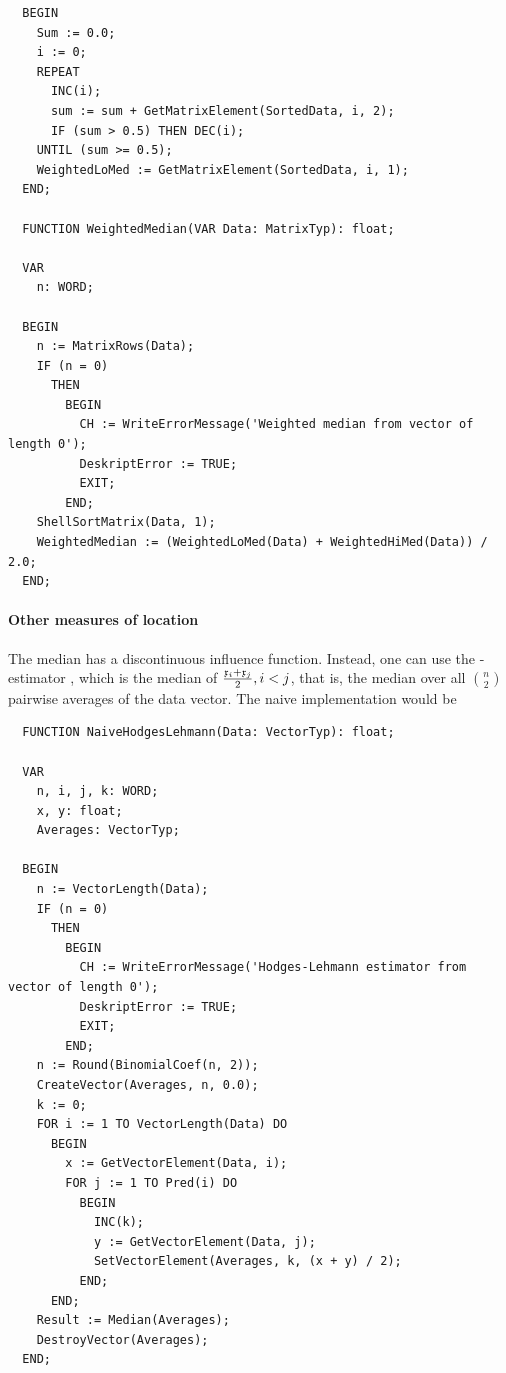 \begin{refsection}
\begin{lstlisting}
  BEGIN
    Sum := 0.0;
    i := 0;
    REPEAT
      INC(i);
      sum := sum + GetMatrixElement(SortedData, i, 2);
      IF (sum > 0.5) THEN DEC(i);
    UNTIL (sum >= 0.5);
    WeightedLoMed := GetMatrixElement(SortedData, i, 1);
  END;

  FUNCTION WeightedMedian(VAR Data: MatrixTyp): float;

  VAR
    n: WORD;

  BEGIN
    n := MatrixRows(Data);
    IF (n = 0)
      THEN
        BEGIN
          CH := WriteErrorMessage('Weighted median from vector of length 0');
          DeskriptError := TRUE;
          EXIT;
        END;
    ShellSortMatrix(Data, 1);
    WeightedMedian := (WeightedLoMed(Data) + WeightedHiMed(Data)) / 2.0;
  END;
\end{lstlisting}

\paragraph{Other measures of location}

The median has a discontinuous influence function. Instead, one can use the -estimator \parencite{Hod-63}, which is the median of \( \frac{\mathfrak{x}_i + \mathfrak{x}_j}{2}, i < j \), that is, the median over all \( \binom{n}{2} \) pairwise averages of the data vector. The naive implementation would be

\begin{lstlisting}
  FUNCTION NaiveHodgesLehmann(Data: VectorTyp): float;

  VAR
    n, i, j, k: WORD;
    x, y: float;
    Averages: VectorTyp;

  BEGIN
    n := VectorLength(Data);
    IF (n = 0)
      THEN
        BEGIN
          CH := WriteErrorMessage('Hodges-Lehmann estimator from vector of length 0');
          DeskriptError := TRUE;
          EXIT;
        END;
    n := Round(BinomialCoef(n, 2));
    CreateVector(Averages, n, 0.0);
    k := 0;
    FOR i := 1 TO VectorLength(Data) DO
      BEGIN
        x := GetVectorElement(Data, i);
        FOR j := 1 TO Pred(i) DO
          BEGIN
            INC(k);
            y := GetVectorElement(Data, j);
            SetVectorElement(Averages, k, (x + y) / 2);
          END;
      END;
    Result := Median(Averages);
    DestroyVector(Averages);
  END;
\end{lstlisting}


\end{refsection}
